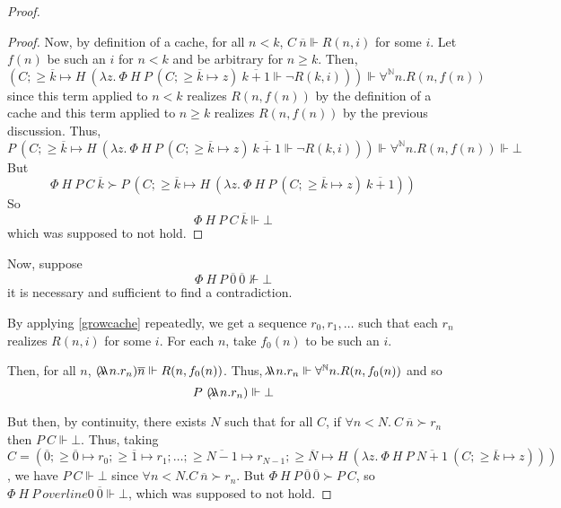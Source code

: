 \documentclass{article}
\newcommand{\N}{\mathbb{N}}
\newcommand{\depforall}[1]{\forall^\N #1.}
\newcommand{\realizes}{\Vdash}
\newcommand{\oracle}[2]{\lambda\mkern-15mu\lambda\ #1. #2}
\begin{document}
\begin{proof}
\begin{proof}
    Now, by definition of a cache, for all $n < k$, $C\ \overline{n} \realizes R(n, i)$ for some $i$.
    Let $f(n)$ be such an $i$ for $n < k$ and be arbitrary for $n \ge k$.
    Then,
    \[(C; \ge \overline{k} \mapsto H\ (\lambda z.\ \Phi\ H\ P\ (C; \ge \overline{k} \mapsto z)\ \overline{k+1} \realizes \neg R(k, i))) \realizes \depforall{n} R(n, f(n))\]
    since this term applied to $n < k$ realizes $R(n, f(n))$ by the definition of a cache and this term applied to $n \ge k$ realizes $R(n, f(n))$ by the previous discussion.
    Thus,
    \[P\ (C; \ge \overline{k} \mapsto H\ (\lambda z.\ \Phi\ H\ P\ (C; \ge \overline{k} \mapsto z)\ \overline{k+1} \realizes \neg R(k, i))) \realizes \depforall{n} R(n, f(n)) \realizes \bot\]
    But
    \[\Phi\ H\ P\ C\ \overline{k} \succ P\ (C; \ge \overline{k} \mapsto H\ (\lambda z.\ \Phi\ H\ P\ (C; \ge \overline{k} \mapsto z)\ \overline{k+1}))\]
    So
    \[\Phi\ H\ P\ C\ \overline{k} \realizes \bot\]
    which was supposed to not hold.
\end{proof}

Now, suppose
\[ \Phi\ H\ P\ \overline{0}\ \overline{0} \not\realizes \bot \]
it is necessary and sufficient to find a contradiction.

By applying \cref{growcache} repeatedly, we get a sequence $r_0, r_1, \dots$ such that each $r_n$ realizes $R(n, i)$ for some $i$.
For each $n$, take $f_0(n)$ to be such an $i$.

Then, for all $n$, $(\oracle{n}{r_n}) \overline{n} \realizes R(n, f_0(n))$.
Thus, $\oracle{n}{r_n} \realizes \depforall{n} R(n, f_0(n))$ and so \[P\ (\oracle{n}{r_n}) \realizes \bot\]

But then, by continuity, there exists $N$ such that for all $C$, if $\forall n < N.\ C\ \overline{n} \succ r_n$ then $P\ C \realizes \bot$. Thus, taking $C = (\overline{0}; \ge \overline{0} \mapsto r_0; \ge \overline{1} \mapsto r_1; \dots; \ge \overline{N-1} \mapsto r_{N-1}; \ge \overline{N} \mapsto H\ (\lambda z.\ \Phi\ H\ P\ \overline{N+1}\ (C; \ge \overline{k} \mapsto z)))$, we have $P\ C \realizes \bot$ since $\forall n < N. C\ \overline{n} \succ r_n$.
But $\Phi\ H\ P\ \overline{0}\ \overline{0} \succ P\ C$, so $\Phi\ H\ P\ overline{0}\ \overline{0} \realizes \bot$, which was supposed to not hold.

\end{proof}
\end{document}
